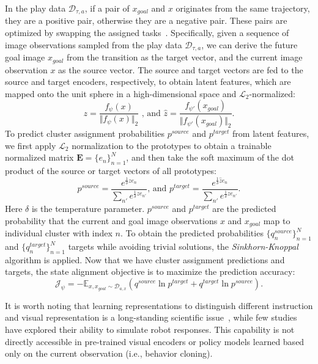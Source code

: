 In the play data $\mathcal{D}_{\tau,a}$, if a pair of $x_{goal}$ and $x$ originates from the same trajectory, they are a positive pair, otherwise they are a negative pair. 
These pairs are optimized by swapping the assigned tasks~\citep{caron2020unsupervised}.
Specifically, given a sequence of image observations sampled from the play data $\mathcal{D}_{\tau,a}$, we can derive the future goal image $x_{goal}$ from the transition as the target vector, and the current image observation $x$ as the source vector. 
The source and target vectors are fed to the source and target encoders, respectively, to obtain latent features, which are mapped onto the unit sphere in a high-dimensional space and $\mathcal{L}_2$-normalized: 
\begin{equation}
z=\frac{f_{\psi}(x)}{\Vert f_{\psi}(x) \Vert_2} \text{ , and } \widehat{z}=\frac{f_{\psi'}(x_{goal})}{\Vert f_{\psi'}(x_{goal}) \Vert_2}. 
\end{equation}
To predict cluster assignment probabilities $p^{source}$ and $p^{target}$ from latent features, we first apply $\mathcal{L}_2$ normalization to the prototypes to obtain a trainable normalized matrix $\mathbf{E}=\{e_n\}_{n=1}^N$, and then take the soft maximum of the dot product of the source or target vectors of all prototypes: 
\begin{equation}
p^{source}=\frac{e^{\frac{1}{\delta}ze_n}}{\sum_{n'}e^{\frac{1}{\delta}ze_{n'}}}
\text{, and }
p^{target}=\frac{e^{\frac{1}{\delta}\widehat{z}e_n}}{\sum_{n'}e^{\frac{1}{\delta}\widehat{z}e_{n'}}}.
\end{equation}
Here $\delta$ is the temperature parameter. 
$p^{source}$ and $p^{target}$ are the predicted probability that the current and goal image observations $x$ and $x_{goal}$ map to individual cluster with index $n$.
To obtain the predicted probabilities $\{q_{n}^{source}\}_{n=1}^{N}$ and $\{q_{n}^{target}\}_{n=1}^{N}$ targets while avoiding trivial solutions, the \textit{Sinkhorn-Knoppal} algorithm \citep{cuturi2013sinkhorn} is applied. 
Now that we have cluster assignment predictions and targets, the state alignment objective is to maximize the prediction accuracy:
\begin{equation}
\mathcal{J}_{\psi}=-\mathbb{ E}_{x,x_{goal}\sim\mathcal{D}_{a,x}}(q^{source}\ln p^{target}+q^{target}\ln p^{source}).
\end{equation}

It is worth noting that learning representations to distinguish different instruction and visual representation is a long-standing scientific issue~\citep{pathak2017curiosity}, while few studies have explored their ability to simulate robot responses. 
This capability is not directly accessible in pre-trained visual encoders or policy models learned based only on the current observation (i.e., behavior cloning).

